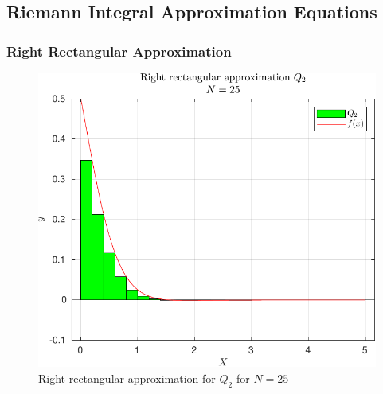 \documentclass[12pt]{article}
\begin{document}
		\subsection{Riemann Integral Approximation Equations}
			\subsubsection{Right Rectangular Approximation}
				
				
				\begin{figure}[H]
					\centering
					\includegraphics[width=1\linewidth]{Code/Fig/q2_bar_plot_25.pdf}
					\caption{\Large Right rectangular approximation for $Q_{2}$ for $N = 25$}
					\label{fig:q2barplot25}
				\end{figure}
			
\end{document}

